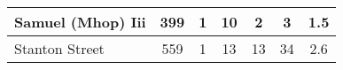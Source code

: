 {\begin{tabular}{l|c|c|c|c|c|c|}
                                                          \\ \hline\multicolumn{1}{|l|}{\cellcolor{ccteallight}Samuel (Mhop) Iii}        & 399                                                   & 1                            & 10                                                   & 2                                                           & 3                                                                & 1.5                                                                \\ \hline\multicolumn{1}{|l|}{\cellcolor{ccteallight}Stanton Street}        & 559                                                   & 1                            & 13                                                   & 13                                                           & 34                                                                & 2.6                                                                \\ \hline
    \end{tabular}
    }
    